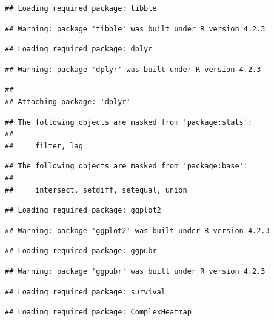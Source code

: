 \documentclass[
  12pt,
]{book}
\begin{document}
\begin{verbatim}
## Loading required package: tibble
\end{verbatim}

\begin{verbatim}
## Warning: package 'tibble' was built under R version 4.2.3
\end{verbatim}

\begin{verbatim}
## Loading required package: dplyr
\end{verbatim}

\begin{verbatim}
## Warning: package 'dplyr' was built under R version 4.2.3
\end{verbatim}

\begin{verbatim}
## 
## Attaching package: 'dplyr'
\end{verbatim}

\begin{verbatim}
## The following objects are masked from 'package:stats':
## 
##     filter, lag
\end{verbatim}

\begin{verbatim}
## The following objects are masked from 'package:base':
## 
##     intersect, setdiff, setequal, union
\end{verbatim}

\begin{verbatim}
## Loading required package: ggplot2
\end{verbatim}

\begin{verbatim}
## Warning: package 'ggplot2' was built under R version 4.2.3
\end{verbatim}

\begin{verbatim}
## Loading required package: ggpubr
\end{verbatim}

\begin{verbatim}
## Warning: package 'ggpubr' was built under R version 4.2.3
\end{verbatim}

\begin{verbatim}
## Loading required package: survival
\end{verbatim}

\begin{verbatim}
## Loading required package: ComplexHeatmap
\end{verbatim}
\end{document}
